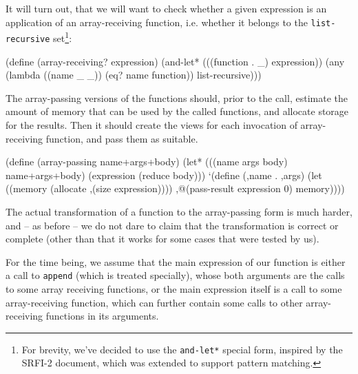 It will turn out, that we will want to check whether a given expression
is an application of an array-receiving function, i.e. whether it belongs
to the \texttt{list-recursive} set\footnote{For brevity, we've decided
  to use the \texttt{and-let*} special form, inspired by the SRFI-2
  document\cite{SRFI-2}, which was extended to support pattern matching.
}:

\begin{Snippet}
    (define (array-receiving? expression)
      (and-let* (((function . _) expression))
	(any (lambda ((name _ _))
	       (eq? name function))
	     list-recursive)))
\end{Snippet}


The array-passing versions of the functions should, prior to the call,
estimate the amount of memory that can be used by the called functions,
and allocate storage for the results. Then it should create the views
for each invocation of array-receiving function, and pass them as
suitable.

\begin{Snippet}
    (define (array-passing name+args+body)
      (let* (((name args body) name+args+body)
	     (expression (reduce body)))
	`(define (,name . ,args)
	   (let ((memory (allocate ,(size expression))))
	     ,@(pass-result expression 0)
	     memory))))
\end{Snippet}

The actual transformation of a function to the array-passing form
is much harder, and -- as before -- we do not dare to claim that the
transformation is correct or complete (other than that it works for
some cases that were tested by us).

For the time being, we assume that the main expression of our
function is either a call to \texttt{append} (which is treated
specially), whose both arguments are the calls to some array receiving
functions, or the main expression itself is a call to some array-receiving
function, which can further contain some calls to other array-receiving
functions in its arguments.

